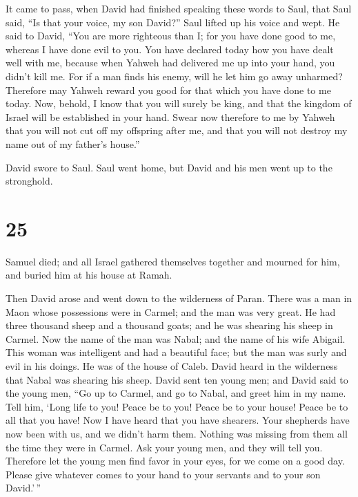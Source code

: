  It came to pass, when David had finished speaking these
words to Saul, that Saul said, ``Is that your voice, my son David?''
Saul lifted up his voice and wept.  He said to David, ``You
are more righteous than I; for you have done good to me, whereas I have
done evil to you.  You have declared today how you have
dealt well with me, because when Yahweh had delivered me up into your
hand, you didn't kill me.  For if a man finds his enemy,
will he let him go away unharmed? Therefore may Yahweh reward you good
for that which you have done to me today.  Now, behold, I
know that you will surely be king, and that the kingdom of Israel will
be established in your hand.  Swear now therefore to me by
Yahweh that you will not cut off my offspring after me, and that you
will not destroy my name out of my father's house.''

 David swore to Saul. Saul went home, but David and his men
went up to the stronghold.

\hypertarget{section-24}{%
\section{25}\label{section-24}}

 Samuel died; and all Israel gathered themselves together
and mourned for him, and buried him at his house at Ramah.

Then David arose and went down to the wilderness of Paran. 
There was a man in Maon whose possessions were in Carmel; and the man
was very great. He had three thousand sheep and a thousand goats; and he
was shearing his sheep in Carmel.  Now the name of the man
was Nabal; and the name of his wife Abigail. This woman was intelligent
and had a beautiful face; but the man was surly and evil in his doings.
He was of the house of Caleb.  David heard in the wilderness
that Nabal was shearing his sheep.  David sent ten young
men; and David said to the young men, ``Go up to Carmel, and go to
Nabal, and greet him in my name.  Tell him, `Long life to
you! Peace be to you! Peace be to your house! Peace be to all that you
have!  Now I have heard that you have shearers. Your
shepherds have now been with us, and we didn't harm them. Nothing was
missing from them all the time they were in Carmel.  Ask
your young men, and they will tell you. Therefore let the young men find
favor in your eyes, for we come on a good day. Please give whatever
comes to your hand to your servants and to your son David.'\,''


